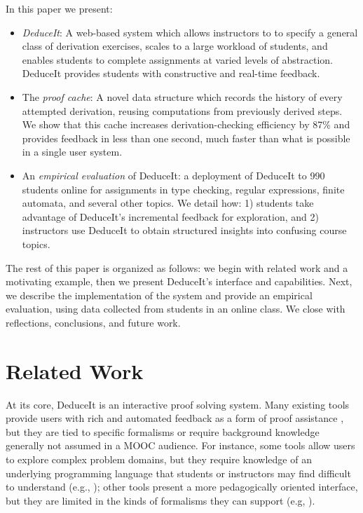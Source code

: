\documentclass{sigchi}
\begin{document}

In this paper we present:
\begin{itemize}
\item \textit{DeduceIt}: A web-based system which allows instructors to to specify a general class of derivation exercises, 
scales to a large workload of students, and enables students to complete assignments at varied levels of abstraction. DeduceIt provides students with constructive and real-time feedback.
\item The \textit{proof cache}: A novel data structure which records the history of every attempted derivation, reusing computations from previously derived steps. We show that this cache increases derivation-checking efficiency by 87\% and provides feedback in less than one second, much faster than what is possible in a single user system.
\item An \textit{empirical evaluation} of DeduceIt: a deployment of DeduceIt to 990 students online
for assignments in type checking, regular expressions, finite automata, and several other topics. We detail how: 1) students take advantage of DeduceIt's incremental feedback for exploration, and 2) instructors use DeduceIt to obtain structured insights into confusing course topics.
\end{itemize}

The rest of this paper is organized as follows: we begin with related work and a motivating example, then we present DeduceIt's interface and capabilities. Next, we describe the implementation of the system and provide an empirical evaluation, using data collected from students in an online class. We close with reflections, conclusions, and future work.

\section{Related Work}
At its core, DeduceIt is an interactive proof solving system. Many existing tools provide users with rich and automated feedback as a form of proof assistance \cite{coq,maude,isabelle, isabelle1,lisp-logic, burstall, its, theorema}, but they are tied to specific formalisms or require background knowledge generally not assumed in a MOOC audience. For instance, some tools allow users to explore complex problem domains, but they require knowledge of an underlying programming language that students or instructors may find difficult to understand (e.g., \cite{coq,isabelle}); other tools present a more pedagogically oriented interface, but they are limited in the kinds of formalisms they can support (e.g, \cite{theorema}). 
\end{document}
